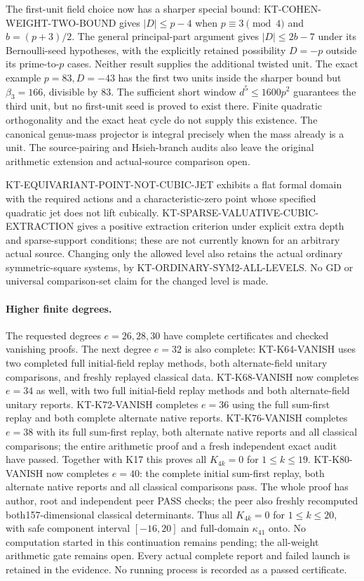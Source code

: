 The first-unit field choice now has a sharper special bound:
KT-COHEN-WEIGHT-TWO-BOUND gives $|D|\leq p-4$ when
$p\equiv3\pmod4$ and $b=(p+3)/2$.
The general principal-part argument gives $|D|\leq2b-7$
under its Bernoulli-seed hypotheses, with the explicitly
retained possibility $D=-p$ outside its prime-to-$p$ cases.
Neither result supplies the additional twisted unit.
The exact example $p=83,D=-43$ has the first two units
inside the sharper bound but $\beta_3=166$, divisible by $83$.
The sufficient short window $d^5\leq1600p^2$ guarantees
the third unit, but no first-unit seed is proved to exist there.
Finite quadratic orthogonality and the exact heat cycle do
not supply this existence. The canonical genus-mass projector
is integral precisely when the mass already is a unit.
The source-pairing and Hsieh-branch audits also leave the
original arithmetic extension and actual-source comparison open.

KT-EQUIVARIANT-POINT-NOT-CUBIC-JET exhibits a flat formal domain
with the required actions and a characteristic-zero point whose
specified quadratic jet does not lift cubically.
KT-SPARSE-VALUATIVE-CUBIC-EXTRACTION gives a positive extraction
criterion under explicit extra depth and sparse-support conditions;
these are not currently known for an arbitrary actual source.
Changing only the allowed level also retains the actual
ordinary symmetric-square systems, by
KT-ORDINARY-SYM2-ALL-LEVELS. No GD or universal comparison-set
claim for the changed level is made.

\paragraph{Higher finite degrees.}
The requested degrees $e=26,28,30$ have complete certificates and
checked vanishing proofs. The next degree $e=32$ is also complete:
KT-K64-VANISH uses two completed full initial-field replay methods,
both alternate-field unitary comparisons, and freshly replayed
classical data. KT-K68-VANISH now completes $e=34$ as well,
with two full initial-field replay methods and both alternate-field
unitary reports. KT-K72-VANISH completes $e=36$ using the full
sum-first replay and both complete alternate native reports.
KT-K76-VANISH completes $e=38$ with its full sum-first replay,
both alternate native reports and all classical comparisons;
the entire arithmetic proof and a fresh independent exact
audit have passed. Together with K17 this proves all $K_{4k}=0$
for $1\le k\le19$. KT-K80-VANISH now completes $e=40$:
the complete initial sum-first replay, both alternate native
reports and all classical comparisons pass. The whole proof
has author, root and independent peer PASS checks; the peer
also freshly recomputed both157-dimensional classical determinants.
Thus all $K_{4k}=0$ for $1\le k\le20$, with safe component
interval $[-16,20]$ and full-domain $\kappa_{41}$ onto.
No computation started in this continuation remains pending;
the all-weight arithmetic gate remains open.
Every actual complete report and failed launch is retained in the
evidence. No running process is recorded as a passed certificate.

